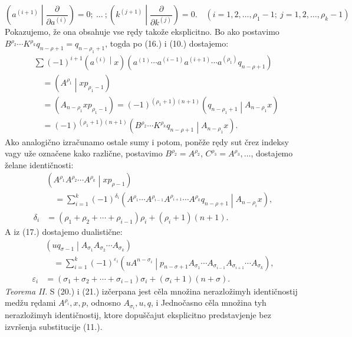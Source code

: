 \documentclass[11pt]{article}
\newcommand{\pair}[2]{\left(#1\middle|#2\right)}
\newcommand{\eps}{\varepsilon}
\begin{document}
\begin{equation}
 \left(a^{(i+1)}\middle|\frac{\partial}{\partial a^{(i)}}\right)=0;\ \ldots\ ;
 \left(k^{(j+1)}\middle|\frac{\partial}{\partial k^{(j)}}\right)=0.
 \quad (i=1,2,\ldots,\rho_1-1;\ j=1,2,\ldots,\rho_k-1)
\tag{19}
\end{equation}
Pokazujemo, že ona obsahuje vse rędy takože eksplicitno. Bo ako postavimo $B^{\rho_2}\cdots K^{\rho_k}q_{n-\rho+1}=q_{n-\rho_1+1}$, togda po (16.) i (10.) dostajemo:
\[
\begin{aligned}
&\sum(-1)^{i+1}\pair{a^{(i)}}{x}
(a^{(1)}\cdots a^{(i-1)}a^{(i+1)}\cdots a^{(\rho_1)}q_{n-\rho+1})\\
&\quad=\pair{A^{\rho_1}}{xp_{\rho_1-1}}\\
&\quad=(A_{n-\rho_1}xp_{\rho_1-1})
=(-1)^{(\rho_1+1)(n+1)}\pair{q_{n-\rho_1+1}}{A_{n-\rho_1}x}\\
&\quad=(-1)^{(\rho_1+1)(n+1)}
\pair{B^{\rho_2}\cdots K^{\rho_k}q_{n-\rho+1}}{A_{n-\rho_1}x}.
\end{aligned}
\]
Ako analogično izračunamo ostale sumy i potom, poněže rędy sut črez indeksy vagy uže označene kako različne, postavimo $B^{\rho_2}=A^{\rho_2}$, $C^{\rho_3}=A^{\rho_3},\ldots$, dostajemo želane identičnosti:
\begin{equation}
\begin{aligned}
&\pair{A^{\rho_1}A^{\rho_2}\cdots A^{\rho_k}}{xp_{\rho-1}}\\
&\quad=\sum_{i=1}^{k}(-1)^{\delta_i}
\pair{A^{\rho_1}\cdots A^{\rho_{i-1}}A^{\rho_{i+1}}\cdots A^{\rho_k}q_{n-\rho+1}}{A_{n-\rho_i}x},\\
\delta_i&=(\rho_1+\rho_2+\cdots+\rho_{i-1})\rho_i+(\rho_i+1)(n+1).
\end{aligned}
\tag{20}
\end{equation}
A iz (17.) dostajemo dualistične:
\begin{equation}
\begin{aligned}
&\pair{u q_{\sigma-1}}{A_{\sigma_1}A_{\sigma_2}\cdots A_{\sigma_k}}\\
&\quad=\sum_{i=1}^{k}(-1)^{\eps_i}
\pair{u A^{n-\sigma_i}}{p_{n-\sigma+1}A_{\sigma_1}\cdots A_{\sigma_{i-1}}A_{\sigma_{i+1}}\cdots A_{\sigma_k}},\\
\eps_i&=(\sigma_1+\sigma_2+\cdots+\sigma_{i-1})\sigma_i+(\sigma_i+1)(n+\sigma).
\end{aligned}
\tag{21}
\end{equation}
\emph{Teorema II.} S (20.) i (21.) izčerpana jest cěla množina nerazložimyh identičnostij medžu rędami $A^{\rho_i},x,p$, odnosno $A_{\sigma_i},u,q$, i Jednočasno cěla množina tyh nerazložimyh identičnostij, ktore dopuščajut eksplicitno predstavjenje bez izvršenja substitucije (11.).
\end{document}
